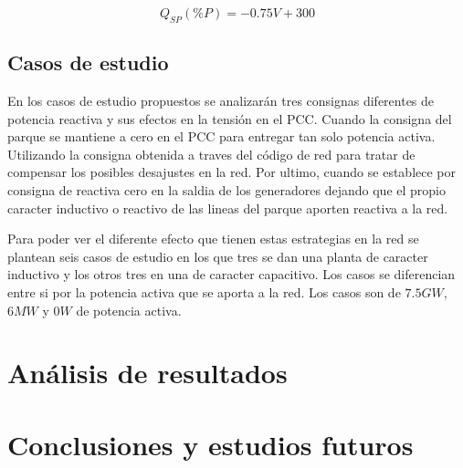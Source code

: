 \documentclass{book}
\begin{document}
\begin{equation}\label{eq:QV}
	Q_{SP}(\%P)= -0.75V +300 
\end{equation} \par

	\section{Casos de estudio}

En los casos de estudio propuestos se analizar\'an tres consignas diferentes de potencia reactiva y sus efectos en la tensi\'on en el PCC. Cuando la consigna del parque se mantiene a cero en el PCC para entregar tan solo potencia activa. Utilizando la consigna obtenida a traves del c\'odigo de red para tratar de compensar los posibles desajustes en la red. Por ultimo, cuando se establece por consigna de reactiva cero en la saldia de los generadores dejando que el propio caracter inductivo o reactivo de las lineas del parque aporten reactiva a la red. \par

Para poder ver el diferente efecto que tienen estas estrategias en la red se plantean seis casos de estudio en los que tres se dan una planta de caracter inductivo y los otros tres en una de caracter capacitivo. Los casos se diferencian entre si por la potencia activa que se aporta a la red. Los casos son de $7.5 GW$, $6MW$ y $0W$ de potencia activa.  \par



\chapter{An\'alisis de resultados}


\chapter{Conclusiones y estudios futuros}



\end{document}
